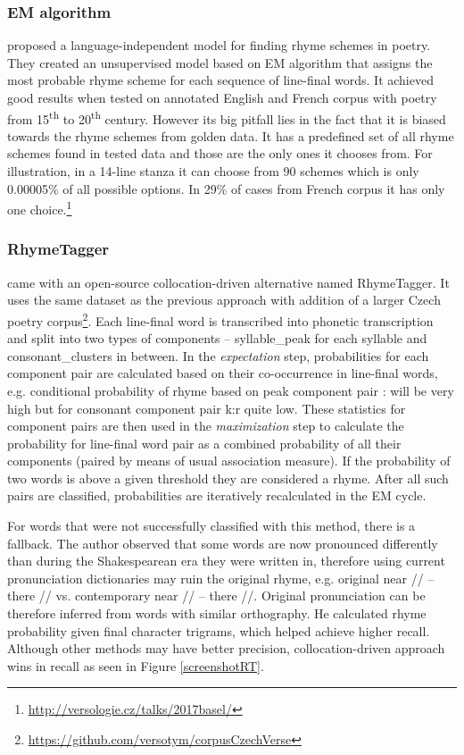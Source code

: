\subsubsection*{EM algorithm}
\cite{reddy2011unsupervised} proposed a language-independent model for finding rhyme schemes in poetry. They created an unsupervised model based on EM algorithm that assigns the most probable rhyme scheme for each sequence of line-final words. It achieved good results when tested on annotated English and French corpus with poetry from 15\textsuperscript{th} to 20\textsuperscript{th} century. However its big pitfall lies in the fact that it is biased towards the rhyme schemes from golden data. It has a predefined set of all rhyme schemes found in tested data and those are the only ones it chooses from. For illustration, in a 14-line stanza it can choose from 90 schemes which is only 0.00005\% of all possible options. In 29\% of cases from French corpus it has only one choice.\footnote{\url{http://versologie.cz/talks/2017basel/}}

\subsubsection*{RhymeTagger}
\cite{plechavc2018collocation} came with an open-source collocation-driven alternative named RhymeTagger. It uses the same dataset as the previous approach with addition of a larger Czech poetry corpus\footnote{\url{https://github.com/versotym/corpusCzechVerse}}. Each line-final word is transcribed into phonetic transcription and split into two types of components -- \gls{syllable_peak} for each syllable and \gls{consonant_clusters} in between. In the \textit{expectation} step, probabilities for each component pair are calculated based on their co-occurrence in line-final words, e.g. conditional probability of rhyme based on peak component pair : will be very high but for consonant component pair k:r quite low. These statistics for component pairs are then used in the \textit{maximization} step to calculate the probability for line-final word pair as a combined probability of all their components (paired by means of usual association measure). If the probability of two words is above a given threshold they are considered a rhyme. After all such pairs are classified, probabilities are iteratively recalculated in the EM cycle. 

For words that were not successfully classified with this method, there is a fallback. The author observed that some words are now pronounced differently than during the Shakespearean era they were written in, therefore using current pronunciation dictionaries may ruin the original rhyme, e.g. original near // -- there // vs. contemporary near // -- there //. Original pronunciation can be therefore inferred from words with similar orthography. He calculated rhyme probability given final character trigrams, which helped achieve higher recall. Although other methods may have better precision, collocation-driven approach wins in recall as seen in Figure \ref{screenshotRT}. 

